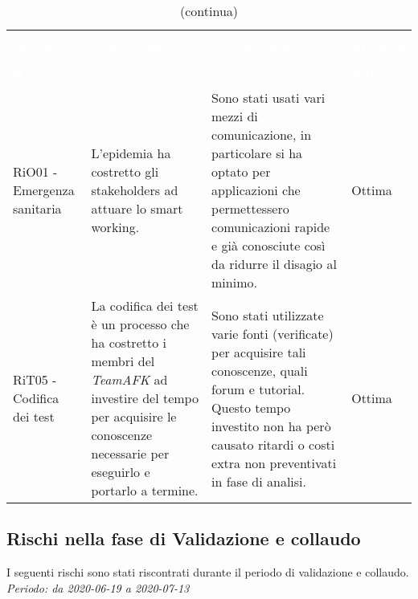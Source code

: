 \begin{longtable}{C{3cm} L{4.5cm} L{5.5cm} C{2cm}}
\caption{Attualizzazione dei rischi - Progettazione di dettaglio e codifica} \\
\textcolor{white}{\textbf{Rischio}} &
\textcolor{white}{\textbf{Descrizione}} &
\textcolor{white}{\textbf{Contromisura}} &
\textcolor{white}{\textbf{Efficacia}}\\
		\endfirsthead
		\caption[]{(continua)} \\
\textcolor{white}{\textbf{Rischio}} &
\textcolor{white}{\textbf{Descrizione}} &
\textcolor{white}{\textbf{Contromisura}} &
\textcolor{white}{\textbf{Efficacia}}\\
		\endhead

RiO01 - Emergenza sanitaria	& L'epidemia ha costretto gli stakeholders ad attuare lo smart working. & Sono stati usati vari mezzi di comunicazione, in particolare si ha optato per applicazioni che permettessero comunicazioni rapide e già conosciute così da ridurre il disagio al minimo. & Ottima
\\
RiT05 - Codifica dei test & La codifica dei test è un processo che ha costretto i membri del \textit{TeamAFK} ad investire del tempo per acquisire le conoscenze necessarie per eseguirlo e portarlo a termine. & Sono stati utilizzate varie fonti (verificate) per acquisire tali conoscenze, quali forum e tutorial. Questo tempo investito non ha però causato ritardi o costi extra non preventivati in fase di analisi. & Ottima \\


\end{longtable}

\subsection{Rischi nella fase di Validazione e collaudo}
I seguenti rischi sono stati riscontrati durante il periodo di validazione e collaudo. \\
\textit{Periodo: da 2020-06-19 a 2020-07-13}


